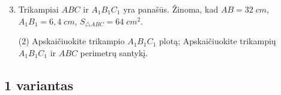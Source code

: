 \documentclass[a4paper]{article}
\begin{document}
\begin{enumerate}
      \setcounter{enumi}{2} %
      \item Trikampiai $ABC$ ir $A_1B_1C_1$ yra panašūs. Žinoma, kad $AB=32 \; cm$,
            $A_1B_1=6,4 \; cm$, $S_{\triangle ABC}=64 \; cm^2$.
            \begin{tasks}[item-format={\normalfont}, after-item-skip=2mm](2)
                  \task Apskaičiuokite trikampio $A_1B_1C_1$ plotą;
                  \task Apskaičiuokite trikampių $A_1B_1C_1$ ir $ABC$ perimetrų santykį.
            \end{tasks}
\end{enumerate}

\subsection*{1 variantas}
\end{document}
